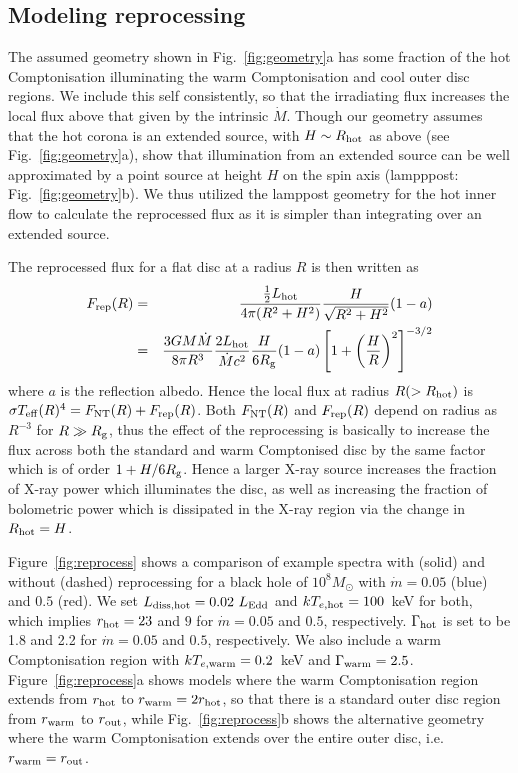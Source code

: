 \documentclass[a4paper,fleqn,usenatbib]{mnras}
\begin{document}
\subsection{Modeling reprocessing }
\label{sec:reprocess}

The assumed geometry  shown in Fig.~\ref{fig:geometry}a has
some fraction of the hot Comptonisation illuminating the warm
Comptonisation and cool outer disc regions. We include this self
consistently, so that the irradiating flux increases the local flux
above that given by the intrinsic $\dot{M}$.  
Though our geometry assumes
that the hot corona is an extended source, with $H\sim R_{\rm hot}$
as above
(see Fig.~\ref{fig:geometry}a), \cite{gardner2017} show that
illumination from an extended source can be well approximated by 
a point source at height $H$ on the spin axis
(lampppost: Fig.~\ref{fig:geometry}b).  We thus utilized the lamppost
geometry for the hot inner flow to calculate the reprocessed flux as
it is simpler than integrating over an extended source.  

The reprocessed flux for a flat disc at a
radius $R$ is then written as
\begin{eqnarray}
\label{eq:frep}
F_{\rm rep}(R)&=&\frac{\frac{1}{2}L_{\rm hot}}{4\pi(R^2+H^2)} \frac{H}{\sqrt{R^2+H^2}}(1-a)\nonumber\\
&=&\frac{3GM\dot{M}}{8\pi R^3} \frac{2L_{\rm hot}}{\dot{M}c^2}\frac{H}{6R_{\rm g}}(1-a)\left[1+\left(\frac{H}{R}\right)^2\right]^{-3/2}  
\end{eqnarray}
where $a$ is the reflection albedo. 
Hence the local flux at radius 
$R(>R_{\rm hot})$ is $\sigma T_{\rm eff}(R) ^4=F_{\rm NT}(R)+F_{\rm
  rep}(R)$.
%
Both $F_{\rm NT}(R)$ and $F_{\rm rep}(R)$ depend on radius as $R^{-3}$
for $R\gg R_{\rm g}$, thus the effect of the reprocessing is basically
to increase the flux across both the standard and warm Comptonised
disc by the same factor which is of order $1 + H/6R_{\rm g}$. Hence a
larger X-ray source increases the fraction of X-ray power which
illuminates the disc, as well as increasing the fraction of bolometric
power which is dissipated in the X-ray region via the change in
$R_{\rm hot}=H$.

Figure~\ref{fig:reprocess} shows a comparison of example spectra with
(solid) and without (dashed) reprocessing for a black hole of
$10^8M_\odot$ with $\dot{m}=0.05$ (blue) and $0.5$ (red).  We set
$L_{\rm diss, hot}=0.02~L_{\rm Edd}$ and $kT_{e,\rm hot}=100$~keV for
both, which implies $r_{\rm hot}=23$ and $9$ for
$\dot{m}=0.05$ and $0.5$, respectively.  $\Gamma_{\rm hot}$ is set to
be 1.8 and 2.2 for $\dot{m}=0.05$ and $0.5$, respectively. We also
include a warm Comptonisation region with $kT_{e,{\rm warm}}=0.2$~keV and
$\Gamma_{\rm warm}=2.5$. Figure~\ref{fig:reprocess}a shows models
where the warm Comptonisation region extends from $r_{\rm hot}$ to
$r_{\rm warm}=2r_{\rm hot}$, so that there is a standard outer disc
region from $r_{\rm warm}$ to $r_{\rm out}$, while
Fig.~\ref{fig:reprocess}b shows the alternative geometry where the
warm Comptonisation extends over the entire outer disc, i.e. $r_{\rm
  warm}=r_{\rm out}$.
\end{document}
